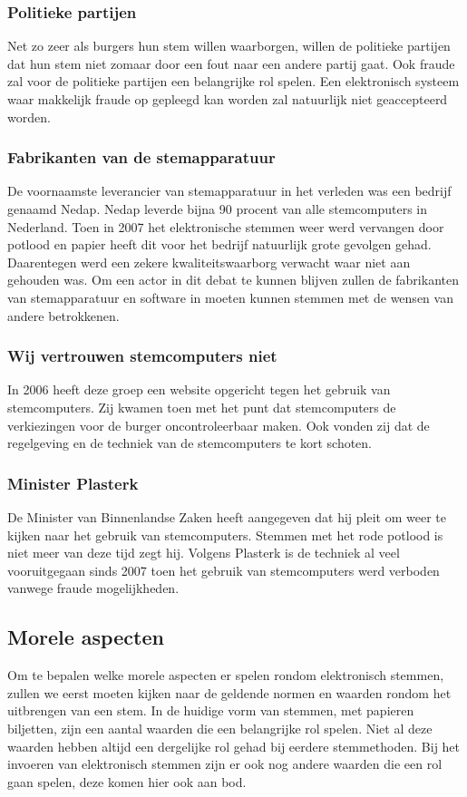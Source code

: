 \documentclass[a4paper]{article}
\begin{document}
\subsubsection{Politieke partijen}
Net zo zeer als burgers hun stem willen waarborgen, willen de politieke partijen dat hun stem niet zomaar door een fout naar een andere partij gaat.
Ook fraude zal voor de politieke partijen een belangrijke rol spelen. 
Een elektronisch systeem waar makkelijk fraude op gepleegd kan worden zal natuurlijk niet geaccepteerd worden.

\subsubsection{Fabrikanten van de stemapparatuur}
De voornaamste leverancier van stemapparatuur in het verleden was een bedrijf genaamd Nedap.
Nedap leverde bijna 90 procent van alle stemcomputers in Nederland.
Toen in 2007 het elektronische stemmen weer werd vervangen door potlood en papier heeft dit voor het bedrijf natuurlijk grote gevolgen gehad.
Daarentegen werd een zekere kwaliteitswaarborg verwacht waar niet aan gehouden was.
Om een actor in dit debat te kunnen blijven zullen de fabrikanten van stemapparatuur en software in moeten kunnen stemmen met de wensen van andere betrokkenen.

\subsubsection{Wij vertrouwen stemcomputers niet}
In 2006 heeft deze groep een website opgericht tegen het gebruik van stemcomputers. 
Zij kwamen toen met het punt dat stemcomputers de verkiezingen voor de burger oncontroleerbaar maken.
Ook vonden zij dat de regelgeving en de techniek van de stemcomputers te kort schoten.

\subsubsection{Minister Plasterk}
De Minister van Binnenlandse Zaken heeft aangegeven dat hij pleit om weer te kijken naar het gebruik van stemcomputers.
Stemmen met het rode potlood is niet meer van deze tijd zegt hij. 
Volgens Plasterk is de techniek al veel vooruitgegaan sinds 2007 toen het gebruik van stemcomputers werd verboden vanwege fraude mogelijkheden.


\subsection{Morele aspecten}
Om te bepalen welke morele aspecten er spelen rondom elektronisch stemmen, zullen we eerst moeten kijken naar de geldende normen en waarden rondom het uitbrengen van een stem.
In de huidige vorm van stemmen, met papieren biljetten, zijn een aantal waarden die een belangrijke rol spelen.
Niet al deze waarden hebben altijd een dergelijke rol gehad bij eerdere stemmethoden.
Bij het invoeren van elektronisch stemmen zijn er ook nog andere waarden die een rol gaan spelen, deze komen hier ook aan bod.
\end{document}
